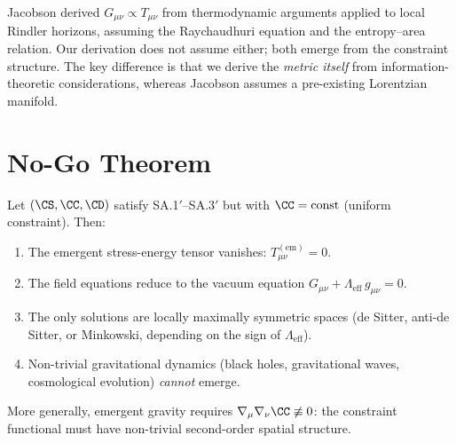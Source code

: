 \begin{remark}
Jacobson derived $G_{\mu\nu} \propto T_{\mu\nu}$ from thermodynamic
arguments applied to local Rindler horizons, assuming the
Raychaudhuri equation and the entropy--area relation.  Our derivation
does not assume either; both emerge from the constraint structure.
The key difference is that we derive the \emph{metric itself} from
information-theoretic considerations, whereas Jacobson assumes a
pre-existing Lorentzian manifold.
\end{remark}

\section{No-Go Theorem}
\label{sec:ch15:nogo}

\begin{theorem}
\label{thm:15.9}
Let $(\CS, \CC, \CD)$ satisfy SA.1$'$--SA.3$'$ but with
$\CC = \mathrm{const}$ (uniform constraint).  Then:
\begin{enumerate}
  \item The emergent stress-energy tensor vanishes:
        $T_{\mu\nu}^{(\mathrm{em})} = 0$.
  \item The field equations reduce to the vacuum equation
        $G_{\mu\nu} + \Lambda_{\mathrm{eff}}\,g_{\mu\nu} = 0$.
  \item The only solutions are locally maximally symmetric spaces
        (de Sitter, anti-de Sitter, or Minkowski, depending on the
        sign of $\Lambda_{\mathrm{eff}}$).
  \item Non-trivial gravitational dynamics (black holes, gravitational
        waves, cosmological evolution) \emph{cannot} emerge.
\end{enumerate}
More generally, emergent gravity requires
$\nabla_\mu\nabla_\nu\CC \not\equiv 0$: the constraint functional
must have non-trivial second-order spatial structure.
\end{theorem}

